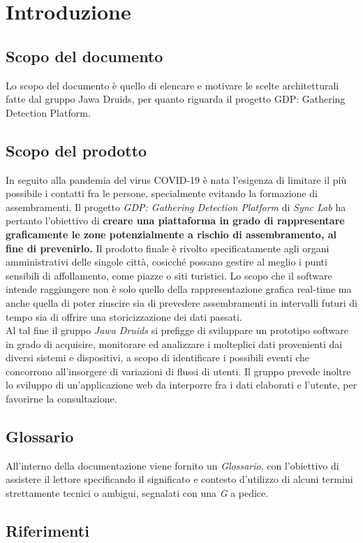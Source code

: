 \chapter{Introduzione}

\section{Scopo del documento}
Lo scopo del documento è quello di elencare e motivare le scelte architetturali fatte dal gruppo Jawa Druids, per quanto riguarda il progetto GDP: Gathering Detection Platform. 
\section{Scopo del prodotto}
In seguito alla pandemia del virus COVID-19 è nata l'esigenza di limitare il più possibile i contatti fra le persone, specialmente evitando la formazione di assembramenti. Il progetto \textit{GDP: Gathering Detection Platform} di \textit{Sync Lab} ha pertanto l'obiettivo di \textbf{creare una piattaforma in grado di rappresentare graficamente le zone potenzialmente a rischio di assembramento, al fine di prevenirlo.}
Il prodotto finale è rivolto specificatamente agli organi amministrativi delle singole città, cosicché possano gestire al meglio i punti sensibili di affollamento, come piazze o siti turistici.
Lo scopo che il software intende raggiungere non è solo quello della rappresentazione grafica real-time ma anche quella di poter riuscire sia di prevedere assembramenti in intervalli futuri di tempo sia di offrire una storicizzazione dei dati passati. \\
Al tal fine il gruppo \textit{Jawa Druids} si prefigge di sviluppare un prototipo software in grado di acquisire, monitorare ed analizzare i molteplici dati provenienti dai diversi sistemi e dispositivi, a scopo di identificare i possibili eventi che concorrono all’insorgere di variazioni di flussi di utenti. Il gruppo prevede inoltre lo sviluppo di un'applicazione web da interporre fra i dati elaborati e l'utente, per favorirne la consultazione.
\section{Glossario}
All'interno della documentazione viene fornito un \textit{Glossario}, con l'obiettivo di assistere il lettore specificando il significato e contesto d'utilizzo di alcuni termini strettamente tecnici o ambigui, segnalati con una \textit{G} a pedice.
\section{Riferimenti}\label{IntroduzioneRiferimenti}

